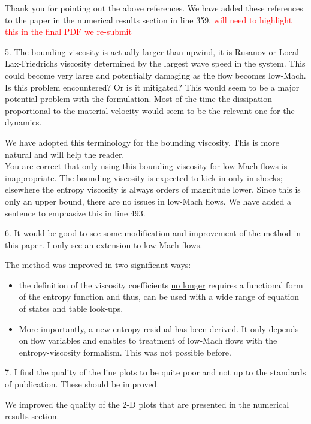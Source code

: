 \documentclass{article}
\newcommand{\tcr}[1]{\textcolor{red}{#1}}
\begin{document}
Thank you for pointing out the above references. We have added these references to the paper in the numerical results section in line 359. \tcr{will need to highlight this in the final PDF we re-submit}
\bigskip


{
\color{blue}
5. The bounding viscosity is actually larger than upwind, it is Rusanov or
Local Lax-Friedrichs viscosity determined by the largest wave speed in the
system. This could become very large and potentially damaging as the
flow becomes low-Mach. Is this problem encountered? Or is it mitigated?
This would seem to be a major potential problem with the formulation.
Most of the time the dissipation proportional to the material velocity
would seem to be the relevant one for the dynamics.
}

We have adopted this terminology for the bounding viscosity. This is more natural and
will help the reader. \\
You are correct that only using this bounding viscosity for low-Mach flows is inappropriate.  
The bounding viscosity is expected to kick in only in shocks; elsewhere the entropy viscosity is always orders of magnitude lower. Since this is only an upper bound, there are no issues in low-Mach flows. We have added a sentence to emphasize this in line 493.
\bigskip


{
\color{blue}
6. It would be good to see some modification and improvement of the
method in this paper. I only see an extension to low-Mach flows.
}

The method was improved in two significant ways: 
\begin{itemize}
\item the definition of the viscosity coefficients \underline{no longer} requires a functional form of the entropy function and thus, can be used with a wide range of equation of states and table look-ups. 
\item More importantly, a new entropy residual has been derived. It only depends on flow variables and enables to treatment of low-Mach flows with the entropy-viscosity formalism. This was not possible before.
\end{itemize}
\bigskip


{
\color{blue}
7. I find the quality of the line plots to be quite poor and not up to the
standards of publication. These should be improved.
}

We improved the quality of the 2-D plots that are presented in the numerical results section. 
\bigskip
\end{document}
